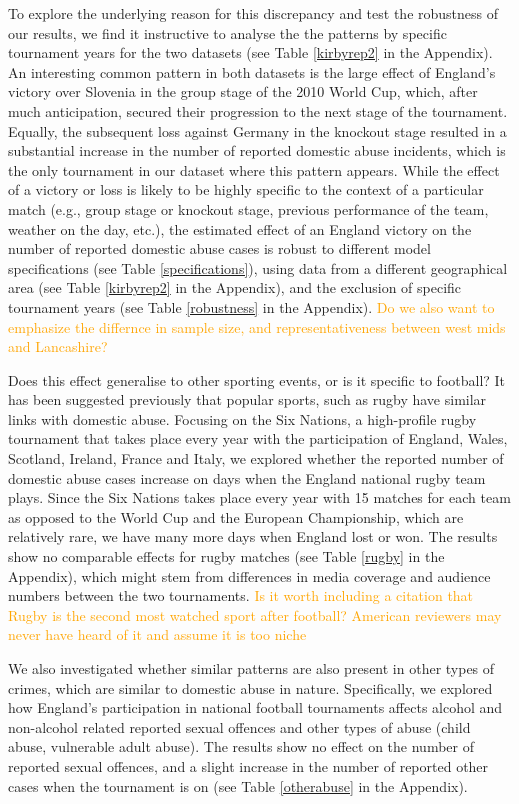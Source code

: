 \documentclass[12pt, letterpaper]{article}
\newcommand{\TM}[1] {{\textcolor{orange}{#1}}}
\begin{document}
To explore the underlying reason for this discrepancy and test the robustness of our results, we find it instructive to analyse the the patterns by specific tournament years for the two datasets (see Table \ref{kirbyrep2} in the Appendix). An interesting common pattern in both datasets is the large effect of England's victory over Slovenia in the group stage of the 2010 World Cup, which, after much anticipation, secured their progression to the next stage of the tournament. Equally, the subsequent loss against Germany in the knockout stage resulted in a substantial increase in the number of reported domestic abuse incidents, which is the only tournament in our dataset where this pattern appears. While the effect of a victory or loss is likely to be highly specific to the context of a particular match (e.g., group stage or knockout stage, previous performance of the team, weather on the day, etc.), the estimated effect of an England victory on the number of reported domestic abuse cases is robust to different model specifications (see Table \ref{specifications}),  using data from a different geographical area (see Table \ref{kirbyrep2} in the Appendix), and the exclusion of specific tournament years (see Table \ref{robustness} in the Appendix). \TM{Do we also want to emphasize the differnce in sample size, and representativeness between west mids and Lancashire?}


Does this effect generalise to other sporting events, or is it specific to football?
It has been suggested previously that popular sports, such as rugby have similar links with domestic abuse\autocite{Brooks-Hay2018}. Focusing on the Six Nations, a high-profile rugby tournament that takes place every year with the participation of England, Wales, Scotland, Ireland, France and Italy, we explored whether the reported number of domestic abuse cases increase on days when the England national rugby team plays. Since the Six Nations takes place every year with 15 matches for each team as opposed to the World Cup and the European Championship, which are relatively rare, we have many more days when England lost or won. The results show no comparable effects for rugby matches (see Table \ref{rugby} in the Appendix), which might stem from differences in media coverage and audience numbers between the two tournaments.  \TM{Is it worth including a citation that Rugby is the second most watched sport after football? American reviewers may never have heard of it and assume it is too niche}

We also investigated whether similar patterns are also present in other types of crimes, which are similar to domestic abuse in nature. Specifically, we explored how England's participation in national football tournaments affects alcohol and non-alcohol related reported sexual offences and other types of abuse (child abuse, vulnerable adult abuse). The results show no effect on the number of reported sexual offences, and a slight increase in the number of reported other cases when the tournament is on (see Table \ref{otherabuse} in the Appendix). 
\end{document}
